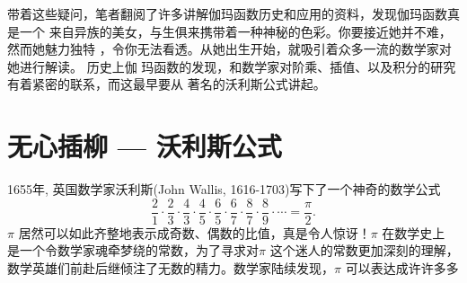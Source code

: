 带着这些疑问，笔者翻阅了许多讲解伽玛函数历史和应用的资料，发现伽玛函数真是一个
来自异族的美女，与生俱来携带着一种神秘的色彩。你要接近她并不难，然而她魅力独特
，令你无法看透。从她出生开始，就吸引着众多一流的数学家对她进行解读。 历史上伽
玛函数的发现，和数学家对阶乘、插值、以及积分的研究有着紧密的联系，而这最早要从
著名的沃利斯公式讲起。

\section{无心插柳 --- 沃利斯公式}

1655年, 英国数学家沃利斯(John Wallis, 1616-1703)写下了一个神奇的数学公式
\begin{equation}
\label{wallis-formula}
\frac{2}{1} \cdot \frac{2}{3} \cdot \frac{4}{3} \cdot \frac{4}{5} \cdot
\frac{6}{5} \cdot \frac{6}{7} \cdot \frac{8}{7} \cdot \frac{8}{9} \cdot \cdots =
\frac{\pi}{2} .
\end{equation}
$\pi$ 居然可以如此齐整地表示成奇数、偶数的比值，真是令人惊讶！$\pi$ 在数学史上
是一个令数学家魂牵梦绕的常数，为了寻求对$\pi$ 这个迷人的常数更加深刻的理解，
数学英雄们前赴后继倾注了无数的精力。数学家陆续发现，$\pi$ 可以表达成许许多多
